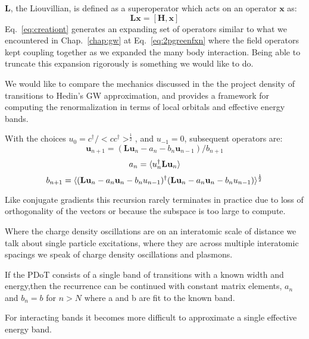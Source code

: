 $\mathbf{L}$, the Liouvillian, is defined as a superoperator which
acts on an operator $\mathbf{x}$ as:
%
\begin{equation}
\mathbf{L} \mathbf{x} = [\mathbf{H}, \mathbf{x}]
\end{equation}
%
Eq.~\ref{eq:creationt} generates an expanding set of operators similar to what we encountered
in Chap.~\ref{chap:gw} at Eq.~\ref{eq:2pgreenfxn} where the field operators kept coupling
together as we expanded the many body interaction. Being able to truncate this expansion
rigorously is something we would like to do.

We would like to compare the mechanics discussed in the the project density of transitions
to Hedin's GW approximation, and provides a framework for computing the renormalization 
in terms of local orbitals and effective energy bands.

With the choices $u_{0}=c^{\dagger}/<c c^{\dagger}>^{\frac{1}{2}}$, and $u_{-1}=0$,
subsequent operators are:
%
\begin{equation}
\label{eq:pdotvectors}
\mathbf{u}_{n+1} = (\mathbf{L} \mathbf{u}_{n} - a_{n}-b_{n}\mathbf{u}_{n-1})/b_{n+1}
\end{equation}
%
\begin{equation}
a_{n} = \langle u^{\dagger}_{n} \mathbf{L} \mathbf{u}_{n} \rangle
\end{equation}
%
\begin{equation}
b_{n+1} = \langle 
(\mathbf{L} \mathbf{u}_{n} - a_{n} \mathbf{u}_{n} - b_{n}u_{n-1})^{\dagger} 
(\mathbf{L} \mathbf{u}_{n} - a_{n} \mathbf{u}_{n} - b_{n}u_{n-1})
\rangle^{\frac{1}{2}}
\end{equation}
%

Like conjugate gradients this recursion rarely terminates in practice 
due to loss of orthogonality of the vectors or because the subspace is 
too large to compute.

Where the charge density oscillations are on an interatomic scale of distance
we talk about single particle excitations, where they are across multiple 
interatomic spacings we speak of charge density oscillations and plasmons.

If the PDoT consists of a single band of transitions with a known width 
and energy,then the recurrence can be continued with constant matrix elements, $a_{n}$ and $b_{n}=b$
for $n>N$ where a and b are fit to the known band. 

For interacting bands it becomes more difficult to approximate a 
single effective energy band.

